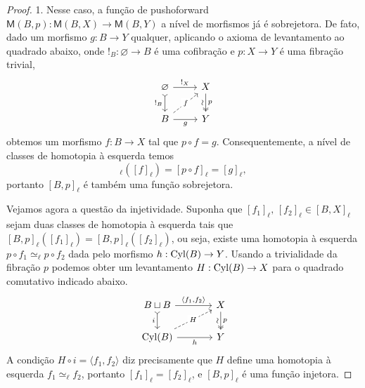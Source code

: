 \begin{proof}
  1. Nesse caso, a função de pushoforward $\mathsf{M}(B,p): \mathsf{M}(B,X) \to \mathsf{M}(B,Y)$ a nível de morfismos já é sobrejetora.
  De fato, dado um morfismo $g: B \to Y$ qualquer,  aplicando o axioma de levantamento ao quadrado abaixo, onde $!_{B}: \varnothing \to B$ é uma cofibração e $p: X \to Y$ é uma fibração trivial,
  \begin{displaymath}
    \begin{tikzcd}
      \varnothing
      \arrow[r, "!_{X}"]
      \arrow[d, tail, "!_{B}" swap]
      & X
      \arrow[d, two heads, "p", "\sim" {swap,sloped}]
      \\ B
      \arrow[r, "g" swap]
      \arrow[ru, dashed, "f" description]
      & Y
    \end{tikzcd}
  \end{displaymath}
  obtemos um morfismo $f: B \to X$ tal que $p \circ f = g$.
  Consequentemente, a nível de classes de homotopia à esquerda temos
  \begin{displaymath}
    [B,p]_{\ell}([f]_{\ell}) = [p \circ f]_{\ell} = [g]_{\ell},
  \end{displaymath}
  portanto $[B,p]_{\ell}$ é também uma função sobrejetora.

  Vejamos agora a questão da injetividade.
  Suponha que $[f_{1}]_{\ell},\,[f_{2}]_{\ell} \in [B,X]_{\ell}$ sejam duas classes de homotopia à esquerda tais que $[B,p]_{\ell}([f_{1}]_{\ell}) = [B,p]_{\ell}([f_{2}]_{\ell})$, ou seja, existe uma homotopia à esquerda $p \circ f_{1} \simeq_{\ell} p \circ f_{2}$ dada pelo morfismo $h: \mathrm{Cyl}(B) \to Y$.
  Usando a trivialidade da fibração $p$ podemos obter um levantamento $H: \mathrm{Cyl}(B) \to X$ para o quadrado comutativo indicado abaixo.
  \begin{displaymath}
    \begin{tikzcd}[column sep=1.25cm]
      B \sqcup B
      \arrow[d, tail, "i" swap]
      \arrow[r, "{\langle f_{1},f_{2} \rangle}"]
      & X
      \arrow[d, two heads, "p", "\sim" {swap,sloped}]
      \\ \Cyl(B)
      \arrow[r, "h" swap]
      \arrow[ru, dashed, "H" description]
      & Y
    \end{tikzcd}
  \end{displaymath}
  A condição $H \circ i = \langle f_{1},f_{2} \rangle$ diz precisamente que $H$ define uma homotopia à esquerda $f_{1} \simeq_{\ell} f_{2}$, portanto $[f_{1}]_{\ell} = [f_{2}]_{\ell}$, e $[B,p]_{\ell}$ é uma função injetora.


\end{proof}

